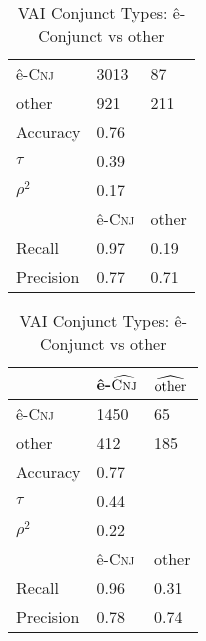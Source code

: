 \begin{table}[H]
\begin{floatrow}[2]
{\begin{tabular}{lll}
                \midrule
ê-\textsc{Cnj}  & 3013                & 87                    \\
other           & 921                & 211                    \\
                     \midrule
                     \midrule
Accuracy             & 0.76               &                       \\
$\tau$               & 0.39               &                       \\
$\rho^{2}$           & 0.17               &                       \\
                     \midrule
                     \midrule
                     & ê-\textsc{Cnj}       & other           \\
Recall               & 0.97               & 0.19                  \\
Precision            & 0.77               & 0.71 \\
                \bottomrule
                \end{tabular}}
    {\caption{VAI Conjunct Types: ê-Conjunct vs other}
      \label{vaiivcms}}
  \end{floatrow}
  \vspace*{1cm}
  \begin{floatrow}[2]
    \ttabbox%
    {                \begin{tabular}{lll}
                \toprule
                     & ê-$\widehat{\textsc{Cnj}}$ & $\widehat{\textup{other}}$ \\
                \midrule
ê-\textsc{Cnj}         & 1450               & 65                    \\
other                  & 412                & 185                    \\
                     \midrule
                     \midrule
Accuracy             & 0.77               &                       \\
$\tau$               & 0.44               &                       \\
$\rho^{2}$           & 0.22               &                       \\
                     \midrule
                     \midrule
                     & ê-\textsc{Cnj}       & other           \\
Recall               & 0.96               & 0.31                  \\
Precision            & 0.78               & 0.74 \\
                \bottomrule

\end{tabular}}
\end{floatrow}
\end{table}
